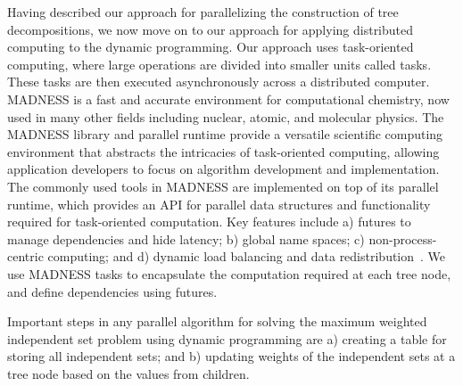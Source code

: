 \documentclass[conference]{IEEEtran}
\begin{document}
Having described our approach
for parallelizing the construction of tree decompositions, we now move on to our approach for applying distributed computing to the dynamic programming. Our approach uses task-oriented computing, where large operations are divided into smaller units called tasks. These tasks are then executed asynchronously across a distributed computer. MADNESS is a fast and accurate
environment for computational chemistry, now used in many other
fields including nuclear, atomic, and molecular
physics. %
The MADNESS library and parallel runtime provide a versatile scientific computing environment that abstracts the intricacies of task-oriented computing, allowing application developers to focus on algorithm development and implementation.
The commonly used tools in MADNESS are
implemented on top of its parallel runtime, which provides an API
for parallel data structures and functionality required for
task-oriented computation. Key features include
a) futures to manage dependencies and hide
latency; b) global name spaces; c) non-process-centric
computing; and d) dynamic load balancing and data redistribution~\cite{Thorntonintroducing}.
We use MADNESS tasks to encapsulate the computation required at each
tree node, and define dependencies using futures.



Important steps in any parallel algorithm for solving the maximum weighted independent set problem
using dynamic programming are a) creating a table for storing all independent sets; and
b) updating weights of the independent sets at a tree node based on the values from children.
\end{document}

